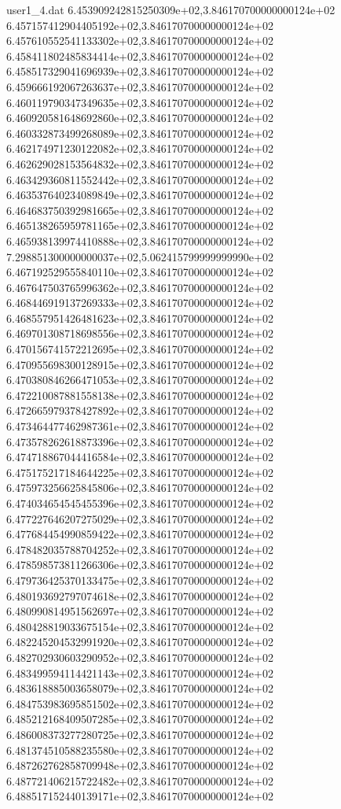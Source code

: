 \begin{filecontents}{user1_4.dat}
6.453909242815250309e+02,3.846170700000000124e+02
6.457157412904405192e+02,3.846170700000000124e+02
6.457610552541133302e+02,3.846170700000000124e+02
6.458411802485834414e+02,3.846170700000000124e+02
6.458517329041696939e+02,3.846170700000000124e+02
6.459666192067263637e+02,3.846170700000000124e+02
6.460119790347349635e+02,3.846170700000000124e+02
6.460920581648692860e+02,3.846170700000000124e+02
6.460332873499268089e+02,3.846170700000000124e+02
6.462174971230122082e+02,3.846170700000000124e+02
6.462629028153564832e+02,3.846170700000000124e+02
6.463429360811552442e+02,3.846170700000000124e+02
6.463537640234089849e+02,3.846170700000000124e+02
6.464683750392981665e+02,3.846170700000000124e+02
6.465138265959781165e+02,3.846170700000000124e+02
6.465938139974410888e+02,3.846170700000000124e+02
7.298851300000000037e+02,5.062415799999999990e+02
6.467192529555840110e+02,3.846170700000000124e+02
6.467647503765996362e+02,3.846170700000000124e+02
6.468446919137269333e+02,3.846170700000000124e+02
6.468557951426481623e+02,3.846170700000000124e+02
6.469701308718698556e+02,3.846170700000000124e+02
6.470156741572212695e+02,3.846170700000000124e+02
6.470955698300128915e+02,3.846170700000000124e+02
6.470380846266471053e+02,3.846170700000000124e+02
6.472210087881558138e+02,3.846170700000000124e+02
6.472665979378427892e+02,3.846170700000000124e+02
6.473464477462987361e+02,3.846170700000000124e+02
6.473578262618873396e+02,3.846170700000000124e+02
6.474718867044416584e+02,3.846170700000000124e+02
6.475175217184644225e+02,3.846170700000000124e+02
6.475973256625845806e+02,3.846170700000000124e+02
6.474034654545455396e+02,3.846170700000000124e+02
6.477227646207275029e+02,3.846170700000000124e+02
6.477684454990859422e+02,3.846170700000000124e+02
6.478482035788704252e+02,3.846170700000000124e+02
6.478598573811266306e+02,3.846170700000000124e+02
6.479736425370133475e+02,3.846170700000000124e+02
6.480193692797074618e+02,3.846170700000000124e+02
6.480990814951562697e+02,3.846170700000000124e+02
6.480428819033675154e+02,3.846170700000000124e+02
6.482245204532991920e+02,3.846170700000000124e+02
6.482702930603290952e+02,3.846170700000000124e+02
6.483499594114421143e+02,3.846170700000000124e+02
6.483618885003658079e+02,3.846170700000000124e+02
6.484753983695851502e+02,3.846170700000000124e+02
6.485212168409507285e+02,3.846170700000000124e+02
6.486008373277280725e+02,3.846170700000000124e+02
6.481374510588235580e+02,3.846170700000000124e+02
6.487262762858709948e+02,3.846170700000000124e+02
6.487721406215722482e+02,3.846170700000000124e+02
6.488517152440139171e+02,3.846170700000000124e+02

\end{filecontents}
